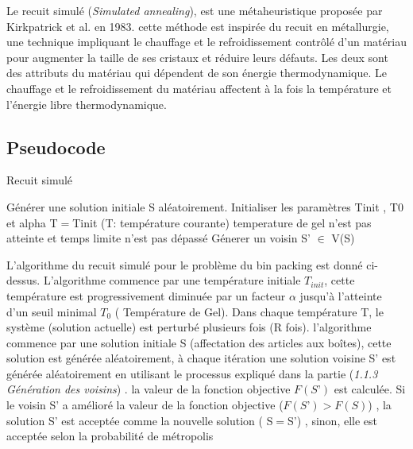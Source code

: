 \documentclass[12pt]{article}
\begin{document}
    Le recuit simulé (\emph{Simulated annealing}), est une métaheuristique proposée par Kirkpatrick et al. \cite{kirkpatrick1983optimization} en 1983. cette méthode est inspirée du recuit en métallurgie, une technique impliquant le chauffage et le refroidissement contrôlé d'un matériau pour augmenter la taille de ses cristaux et réduire leurs défauts. Les deux sont des attributs du matériau qui dépendent de son énergie thermodynamique. Le chauffage et le refroidissement du matériau affectent à la fois la température et l'énergie libre thermodynamique.

\subsection{Pseudocode}

\begin{algorithm}[H]
    \caption{Recuit simulé}
    \begin{algorithmic}
    \STATE Générer une solution initiale S aléatoirement. 
    \STATE Initialiser les paramètres Tinit , T0 et alpha 
    \STATE T$=$Tinit  (T: température courante)
        \STATE temperature de gel n'est pas atteinte et temps limite n'est pas dépassé
        \REPEAT{}
            \STATE Génerer un voisin S' $\in$ V(S) 
            \ELSE
            \ENDIF

            \ENDIF
    \ENDWHILE
     
\end{algorithmic}
\end{algorithm}

    L’algorithme du recuit simulé pour le problème du bin packing est donné ci-dessus.
 L’algorithme commence par une température initiale \emph{$T_{init}$}, cette température est progressivement diminuée par un facteur $\alpha$ jusqu'à l’atteinte d’un seuil minimal \emph{$T_{0}$} ( Température de Gel). 
Dans chaque température T, le système (solution actuelle) est perturbé plusieurs fois (R fois). 
l’algorithme commence par une solution initiale S (affectation des articles aux boîtes), 
cette solution est générée aléatoirement, à chaque itération une solution voisine S’ est générée aléatoirement en utilisant le processus expliqué dans la partie (\emph{1.1.3 Génération des voisins}) . 
la valeur de la fonction objective $F (S’)$ est calculée. 
Si le voisin S’ a amélioré la valeur de la fonction objective ($ F(S’)> F(S)$)  , 
la solution S’ est acceptée comme la nouvelle solution ( S$= $S’) , sinon, elle est acceptée selon la probabilité de métropolis \newline
\end{document}
